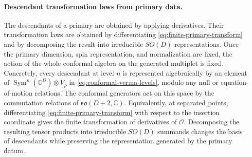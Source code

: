 \paragraph{Descendant transformation laws from primary data.}
The descendants of a primary are obtained by applying derivatives.  Their
transformation laws are obtained by differentiating
\eqref{eq:finite-primary-transform} and by decomposing the result into
irreducible \(SO(D)\) representations.  Once the primary dimension, spin
representation, and normalization are fixed, the action of the whole conformal
algebra on the generated multiplet is fixed.  Concretely, every descendant at
level \(n\) is represented algebraically by an element of
\(\operatorname{Sym}^n(\mathbb C^D)\otimes V_\rho\) in
\eqref{eq:conformal-verma-levels}, modulo any null or equation-of-motion
relations.  The conformal generators act on this space by the commutation
relations of \(\mathfrak{so}(D+2,\mathbb C)\).  Equivalently, at separated
points, differentiating \eqref{eq:finite-primary-transform} with respect to
the insertion coordinate gives the finite transformation of derivatives of
\(\mathcal O\).  Decomposing the resulting tensor products into irreducible
\(SO(D)\) summands changes the basis of descendants while preserving the
representation generated by the primary datum.
